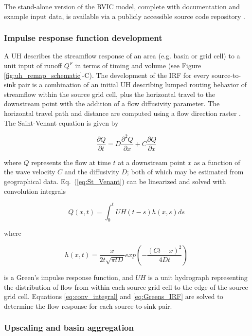 \documentclass[jgrga, draft]{agutex}
\begin{document}
\begin{article}
The stand-alone version of the RVIC model, complete with documentation and example input data, is available via a publicly accessible source code repository \citep{Hamman_2015}.

\subsubsection{Impulse response function development}
\label{sec:irfs}

A UH describes the streamflow response of an area (e.g. basin or grid cell) to a unit input of runoff $Q^F$ in terms of timing and volume (see Figure \ref{fig:uh_remap_schematic}-C).
The development of the IRF for every source-to-sink pair is a combination of an initial UH describing lumped routing behavior of streamflow within the source grid cell, plus the horizontal travel to the downstream point with the addition of a flow diffusivity parameter.
The horizontal travel path and distance are computed using a flow direction raster \citep[e.g.][]{Wu_2011}.
The Saint-Venant equation is given by

 \begin{equation}
   \label{eq:St_Venant}
   \frac{\partial Q}{\partial t} = D \frac{\partial^2 Q}{\partial x} + C \frac{\partial Q}{\partial x}
 \end{equation}

where $Q$ represents the flow at time $t$ at a downstream point $x$ as a function of the wave velocity $C$ and the diffusivity $D$; both of which may be estimated from geographical data.
Eq.~(\ref{eq:St_Venant}) can be linearized and solved with convolution integrals

 \begin{equation}
   \label{eq:conv_integral}
	  Q(x,t) = \int_0^t UH(t-s)h(x,s)ds
 \end{equation}

where

 \begin{equation}
   \label{eq:Greens_IRF}
	h(x, t) = \frac{x}{2t\sqrt{\pi tD}}exp\left(-\frac{(Ct-x)^2}{4Dt}\right)
 \end{equation}

is a Green's impulse response function, and $UH$ is a unit hydrograph representing the distribution of flow from within each source grid cell to the edge of the source grid cell.
Equations \ref{eq:conv_integral} and \ref{eq:Greens_IRF} are solved to determine the flow response for each source-to-sink pair.

\subsubsection{Upscaling and basin aggregation}
\label{sec:remap}


\end{article}
\end{document}
